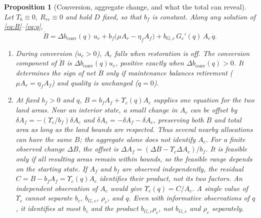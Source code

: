 \documentclass[preprint,12pt,authoryear]{elsarticle}
\newtheorem{proposition}{Proposition}
\newcommand{\dconv}{\Delta b_{\mathrm{conv}}}
\newcommand{\Ups}{\Upsilon_c}
\newcommand{\Acmin}{A_c^{\min}}
\begin{document}
\begin{proposition}[Conversion, aggregate change, and what the total can reveal]\label{prop:mask}
Let $T_b\equiv0$, $R_{rc}\equiv0$ and hold $D$ fixed, so that $b_f$ is constant. Along any solution of \eqref{eq:B}--\eqref{eq:q},
\begin{equation}\label{eq:identity}
\dot B=\dconv(q)\,u_c+b_f\big(\mu A_r-\eta_f A_f\big)+b_{G,c}\,G_c'(q)\,A_c\,\dot q .
\end{equation}
\begin{enumerate}[label=(\roman*)]
\item During conversion ($u_c>0$), $A_c$ falls when restoration is off. The conversion component of $\dot B$ is $\dconv(q)u_c$, positive exactly when $\dconv(q)>0$. It determines the sign of net $\dot B$ only if maintenance balances retirement ($\mu A_r=\eta_fA_f$) and quality is unchanged ($\dot q=0$).
\item At fixed $b_f>0$ and $q$, $B=b_fA_f+\Ups(q)A_c$ supplies one equation for the two land areas. Near an interior state, a small change in $A_c$ can be offset by $\delta A_f=-(\Ups/b_f)\delta A_c$ and $\delta A_r=-\delta A_f-\delta A_c$, preserving both $B$ and total area as long as the land bounds are respected. Thus several nearby allocations can have the same $B$; the aggregate alone does not identify $A_c$. For a finite observed change $\Delta B$, the offset is $\Delta A_f=(\Delta B-\Ups\Delta A_c)/b_f$. It is feasible only if all resulting areas remain within bounds, so the feasible range depends on the starting state. If $A_f$ and $b_f$ are observed independently, the residual $C=B-b_fA_f=\Ups(q)A_c$ identifies their product, not its two factors. An independent observation of $A_c$ would give $\Ups(q)=C/A_c$. A single value of $\Ups$ cannot separate $b_c$, $b_{G,c}$, $\rho_c$, and $q$. Even with informative observations of $q$, it identifies at most $b_c$ and the product $b_{G,c}\rho_c$, not $b_{G,c}$ and $\rho_c$ separately.
\end{enumerate}
\end{proposition}
\end{document}
